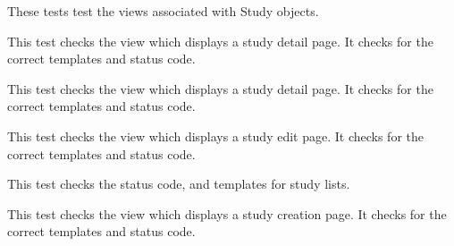 \documentclass[letterpaper,10pt,english]{sphinxmanual}
\begin{document}
\begin{fulllineitems}
\label{data:mousedb.data.tests.StudyViewTests}
These tests test the views associated with Study objects.

\begin{fulllineitems}
\label{data:mousedb.data.tests.StudyViewTests.test_study_delete}
This test checks the view which displays a study detail page.  It checks for the correct templates and status code.

\end{fulllineitems}


\begin{fulllineitems}
\label{data:mousedb.data.tests.StudyViewTests.test_study_detail}
This test checks the view which displays a study detail page.  It checks for the correct templates and status code.

\end{fulllineitems}


\begin{fulllineitems}
\label{data:mousedb.data.tests.StudyViewTests.test_study_edit}
This test checks the view which displays a study edit page.  It checks for the correct templates and status code.

\end{fulllineitems}


\begin{fulllineitems}
\label{data:mousedb.data.tests.StudyViewTests.test_study_list}
This test checks the status code, and templates for study lists.

\end{fulllineitems}


\begin{fulllineitems}
\label{data:mousedb.data.tests.StudyViewTests.test_study_new}
This test checks the view which displays a study creation page.  It checks for the correct templates and status code.

\end{fulllineitems}


\end{fulllineitems}
\end{document}
